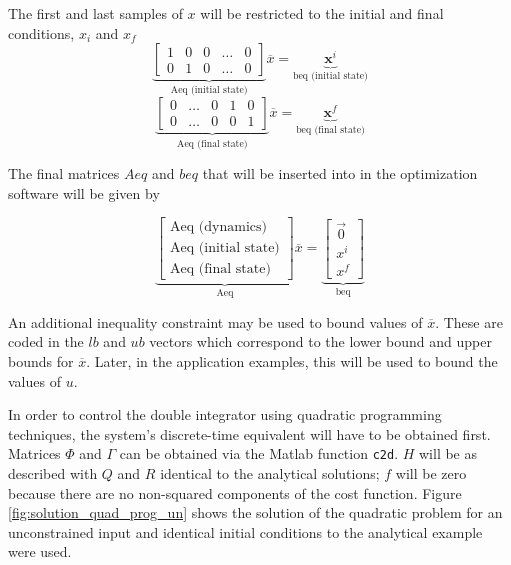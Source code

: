 \par The first and last samples of $x$ will be restricted to the initial and final conditions, $x_i$ and $x_f$
\begin{equation}
    \label{eq:quad_prog_Aeq_init}
    \underbrace{\begin{bmatrix} 
        1 & 0 & 0 & \ldots & 0 \\
        0 & 1 & 0 & \ldots & 0 
    \end{bmatrix}}_\text{Aeq (initial state)}
    \overline{x} = \underbrace{\mathbf{x}^i}_\text{beq (initial state)}
\end{equation}
\begin{equation}
    \label{eq:quad_prog_Aeq_final}
    \underbrace{\begin{bmatrix} 
        0 & \ldots & 0 & 1 & 0 \\
        0 & \ldots & 0 & 0 & 1 
    \end{bmatrix}}_\text{Aeq (final state)}
    \overline{x} = \underbrace{\mathbf{x}^f}_\text{beq (final state)}
\end{equation}

\par The final matrices $Aeq$ and $beq$ that will be inserted into in the optimization software will be given by

\begin{equation}
    \label{eq:quad_prog_Aeq_total}
    \underbrace{\begin{bmatrix}
        \text{Aeq (dynamics)} \\ \text{Aeq (initial state)} \\ \text{Aeq (final state)}
        \end{bmatrix}}_\text{Aeq}
    \overline{x} =
    \underbrace{\begin{bmatrix}
        \vec{0} \\ x^i \\ x^f
        \end{bmatrix}}_\text{beq}
\end{equation}

\par An additional inequality constraint may be used to bound values of $\overline{x}$. These are coded in the $lb$ and $ub$ vectors which correspond to the lower bound and upper bounds for $\overline{x}$. Later, in the application examples, this will be used to bound the values of $u$.


\par In order to control the double integrator using quadratic programming techniques, the system's discrete-time equivalent will have to be obtained first. Matrices $\Phi$ and $\Gamma$ can be obtained via the Matlab function \texttt{c2d}. $H$ will be as described with $Q$ and $R$ identical to the analytical solutions; $f$ will be zero because there are no non-squared components of the cost function. Figure \ref{fig:solution_quad_prog_un} shows the solution of the quadratic problem for an unconstrained input and identical initial conditions to the analytical example were used.

